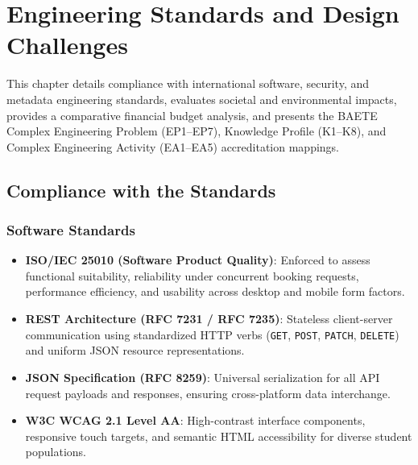 \chapter{Engineering Standards and Design Challenges}

This chapter details compliance with international software, security, and metadata engineering standards, evaluates societal and environmental impacts, provides a comparative financial budget analysis, and presents the BAETE Complex Engineering Problem (EP1--EP7), Knowledge Profile (K1--K8), and Complex Engineering Activity (EA1--EA5) accreditation mappings.

\section{Compliance with the Standards}

\subsection{Software Standards}
\begin{itemize}
    \item \textbf{ISO/IEC 25010 (Software Product Quality)}: Enforced to assess functional suitability, reliability under concurrent booking requests, performance efficiency, and usability across desktop and mobile form factors.
    \item \textbf{REST Architecture (RFC 7231 / RFC 7235)}: Stateless client-server communication using standardized HTTP verbs (\texttt{GET}, \texttt{POST}, \texttt{PATCH}, \texttt{DELETE}) and uniform JSON resource representations.
    \item \textbf{JSON Specification (RFC 8259)}: Universal serialization for all API request payloads and responses, ensuring cross-platform data interchange.
    \item \textbf{W3C WCAG 2.1 Level AA}: High-contrast interface components, responsive touch targets, and semantic HTML accessibility for diverse student populations.
\end{itemize}


